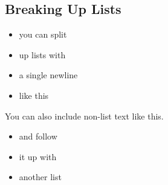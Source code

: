 \documentclass[11pt,letterpaper]{article}
\begin{document}
\begin{multicols*}{2}
\subsection*{Breaking Up Lists}
\begin{itemize}
    \item you can split
    \item up lists with
\end{itemize}
\vspace{-0.3cm}
\begin{itemize}
    \item a single newline
    \item like this
\end{itemize}
You can also include non-list text like this.
\begin{itemize}
    \item and follow
    \item it up with
    \item another list
\end{itemize}


\end{multicols*}
\end{document}
